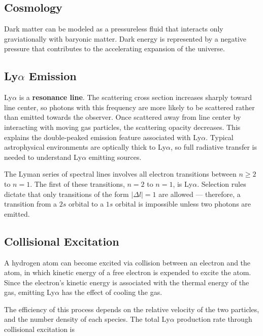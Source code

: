 \documentclass[onecolumn]{aastex63}
\begin{document}


\subsection{Cosmology}

Dark matter can be modeled as a pressureless fluid that interacts only graviationally with baryonic matter. Dark energy is represented by a negative pressure that contributes to the accelerating expansion of the universe.

\subsection{Ly$\alpha$ Emission}
Ly$\alpha$ is a \textbf{resonance line}. The scattering cross section increases sharply toward line center, so photons with this frequency are more likely to be scattered rather than emitted towards the observer. Once scattered away from line center by interacting with moving gas particles, the scattering opacity decreases. This explains the double-peaked emission feature associated with Ly$\alpha$. Typical astrophysical environments are optically thick to Ly$\alpha$, so full radiative transfer is needed to understand Ly$\alpha$ emitting sources.

The Lyman series of spectral lines involves all electron transitions between $n \ge 2$ to $n = 1$. The first of these transitions, $n = 2$ to $n = 1$, is Ly$\alpha$. Selection rules dictate that only transitions of the form $|\Delta l| = 1$ are allowed --- therefore, a transition from a $2s$ orbital to a $1s$ orbital is impossible unless two photons are emitted.

\subsection{Collisional Excitation} A hydrogen atom can become excited via collision between an electron and the atom, in which kinetic energy of a free electron is expended to excite the atom. Since the electron's kinetic energy is associated with the thermal energy of the gas, emitting Ly$\alpha$ has the effect of cooling the gas.

The efficiency of this process depends on the relative velocity of the two particles, and the number density of each species. The total Ly$\alpha$ production rate through collisional excitation is 
\end{document}
